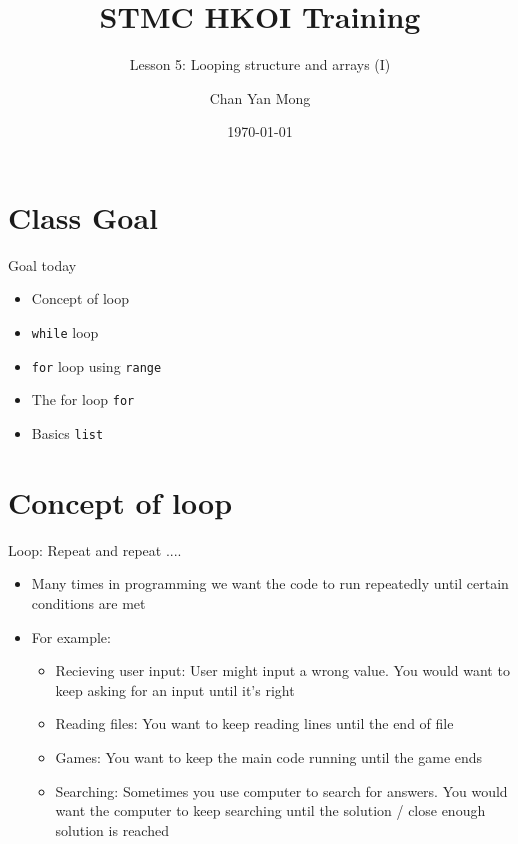 \documentclass[10pt,xcolor={table,dvipsnames},t]{beamer}
\title[Your Short Title]{STMC HKOI Training}
\subtitle{Lesson 5: Looping structure and arrays (I)}
\author{Chan Yan Mong}
\date{\today}
\begin{document}
\begin{frame}
  \titlepage
\end{frame}


\section{Class Goal}

\begin{frame}{Goal today}

\begin{itemize}
  \item Concept of loop
  \item \texttt{while} loop
  \item \texttt{for} loop using \texttt{range}
  \item The for loop \texttt{for}
  \item Basics \texttt{list} 
\end{itemize}

\end{frame}


\section{Concept of loop}
\begin{frame}{Loop: Repeat and repeat ....}
    \begin{itemize}
      \item Many times in programming we want the code to run repeatedly until certain conditions are met
      \vspace{2mm}
      \item For example:
      \begin{itemize}
        \item Recieving user input: User might input a wrong value. You would want to keep asking for an input until it's right
        \item Reading files: You want to keep reading lines until the end of file 
        \item Games: You want to keep the main code running until the game ends
        \item Searching: Sometimes you use computer to search for answers. You would want the computer to keep searching until the solution / close enough solution is reached
      \end{itemize}
    \end{itemize}
\end{frame}
\end{document}
